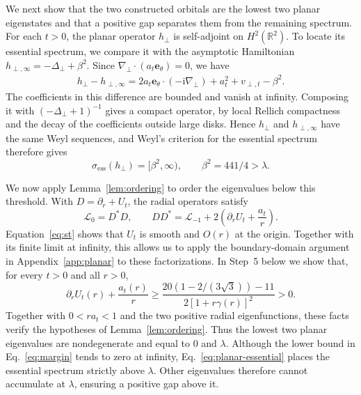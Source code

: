 \documentclass[11pt,a4paper]{article}
\theoremstyle{remark}
\theoremstyle{plain}
\newcommand{\R}{\mathbb R}
\newcommand{\ee}{\mathbf e_\theta}
\begin{document}
We next show that the two constructed orbitals are the lowest two
planar eigenstates and that a positive gap separates them from the
remaining spectrum.
For each $t>0$, the planar operator $h_\perp$ is self-adjoint on
$H^2(\R^2)$. To locate its essential spectrum, we compare it with
the asymptotic Hamiltonian
$h_{\perp,\infty}=-\Delta_\perp+\beta^2$. Since
$\nabla_\perp\cdot(a_t\ee)=0$, we have
\begin{align*}
 h_\perp-h_{\perp,\infty}
 =2a_t\ee\cdot(-\mathrm{i}\nabla_\perp)
 +a_t^2+v_{\perp,t}-\beta^2.
\end{align*}
The coefficients in this difference are bounded and vanish at
infinity. Composing it with $(-\Delta_\perp+1)^{-1}$ gives a compact
operator, by local Rellich compactness and the decay of the
coefficients outside large disks. Hence $h_\perp$ and $h_{\perp,\infty}$
have the same Weyl sequences, and Weyl's criterion for the essential
spectrum~\cite[Theorem~25.57]{GS2020} therefore gives
\begin{equation}
 \sigma_{\mathrm{ess}}(h_\perp)=[\beta^2,\infty),\qquad
 \beta^2=441/4>\lambda.
 \label{eq:planar-essential}
\end{equation}

We now apply Lemma~\ref{lem:ordering} to order the eigenvalues below
this threshold. With $D=\partial_r+U_t$, the radial operators satisfy
\begin{equation*}
 \mathcal L_0=D^*D,\qquad
 DD^*=\mathcal L_{-1}+2\left(\partial_rU_t+\frac{a_t}r\right).
\end{equation*}
Equation~\eqref{eq:st} shows that $U_t$ is smooth and $O(r)$ at the
origin. Together with its finite limit at infinity, this allows us
to apply the boundary-domain argument in Appendix~\ref{app:planar}
to these factorizations.
In Step~5 below we show that, for every $t>0$ and all $r>0$,
\begin{equation}
 \partial_rU_t(r)+\frac{a_t(r)}r\ge
 \frac{20(1-2/(3\sqrt3))-11}{2[1+r\gamma(r)]^2}>0.
 \label{eq:margin}
\end{equation}
Together with $0<ra_t<1$ and the two positive radial
eigenfunctions, these facts verify the hypotheses of
Lemma~\ref{lem:ordering}. Thus the lowest two planar eigenvalues are
nondegenerate and equal to $0$ and $\lambda$. Although the lower
bound in Eq.~\eqref{eq:margin} tends to zero at infinity,
Eq.~\eqref{eq:planar-essential} places the essential spectrum
strictly above $\lambda$. Other eigenvalues therefore cannot
accumulate at $\lambda$, ensuring a positive gap above it.
\end{document}
